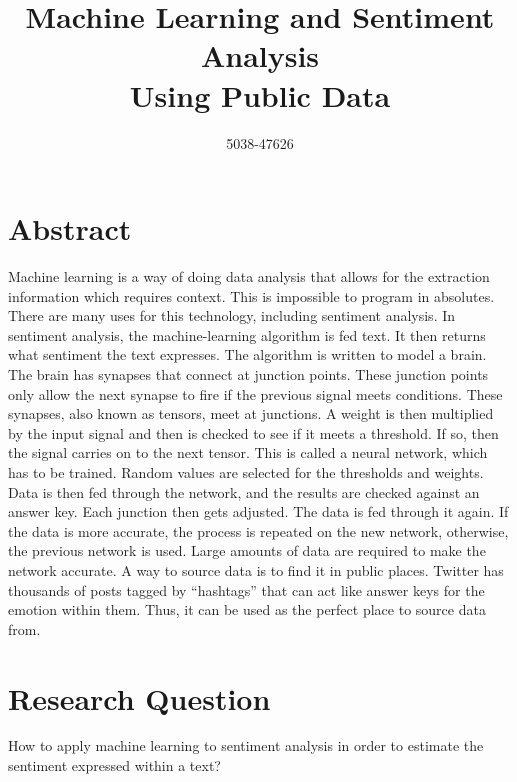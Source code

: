 \documentclass[12pt]{article}
\author{5038-47626}
\title{Machine Learning and Sentiment Analysis\\Using Public Data}
\begin{document}
    \begin{titlepage}
        \maketitle
    \end{titlepage}
    \tableofcontents

		\section{Abstract}
		Machine learning is a way of doing data analysis that allows for the extraction information which requires context. This is impossible to program in absolutes. There are many uses for this technology, including sentiment analysis. In sentiment analysis, the machine-learning algorithm is fed text. It then returns what sentiment the text expresses. The algorithm is written to model a brain. The brain has synapses that connect at junction points. These junction points only allow the next synapse to fire if the previous signal meets conditions. These synapses, also known as tensors, meet at junctions. A weight is then multiplied by the input signal and then is checked to see if it meets a threshold. If so, then the signal carries on to the next tensor. This is called a neural network, which has to be trained. Random values are selected for the thresholds and weights. Data is then fed through the network, and the results are checked against an answer key. Each junction then gets adjusted. The data is fed through it again. If the data is more accurate, the process is repeated on the new network, otherwise, the previous network is used. Large amounts of data are required to make the network accurate. A way to source data is to find it in public places. Twitter has thousands of posts tagged by “hashtags” that can act like answer keys for the emotion within them. Thus, it can be used as the perfect place to source data from.

    \section{Research Question}
    How to apply machine learning to sentiment analysis in order to estimate the sentiment expressed within a text?
\end{document}
